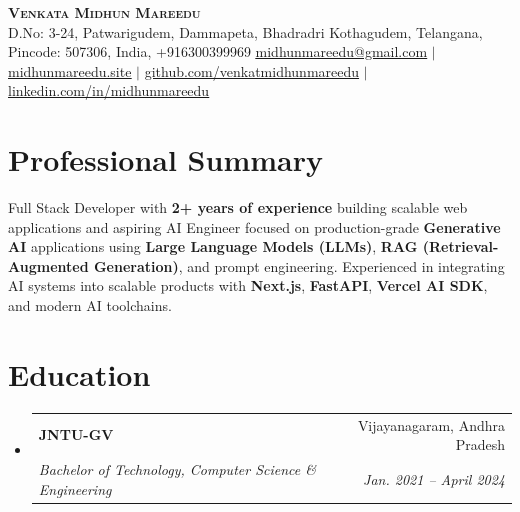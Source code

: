 \documentclass[letterpaper,10pt]{article}
\makeatletter
\newcommand{\summarySection}{
  \small{
    {\vspace{-2pt}}
  }
}
\newcommand{\resumeSubheading}[4]{
  \vspace{-2pt}\item
    \begin{tabular*}{0.97\textwidth}[t]{l@{\extracolsep{\fill}}r}
      \textbf{#1} & #2 \\
      \textit{\small#3} & \textit{\small #4} \\
    \end{tabular*}\vspace{0pt}
}
\newcommand{\resumeSubHeadingListStart}{\begin{itemize}[leftmargin=0.15in, label={}]}
\newcommand{\resumeSubHeadingListEnd}{\end{itemize}}
\makeatother
\begin{document}

\begin{center}
    \textbf{\LARGE \scshape Venkata Midhun Mareedu} \\[3pt]
    \small D.No: 3-24, Patwarigudem, Dammapeta, Bhadradri Kothagudem, Telangana, Pincode: 507306, India, +916300399969
    \small \href{mailto:midhunmareedu@gmail.com}{\underline{midhunmareedu@gmail.com}} $|$ 
    \href{https://midhunmareedu.site}{\underline{midhunmareedu.site}} $|$
    \href{http://github.com/venkatmidhunmareedu}{\underline{github.com/venkatmidhunmareedu}} $|$
    \href{https://www.linkedin.com/in/midhunmareedu}{\underline{linkedin.com/in/midhunmareedu}} \\[3pt]
\end{center}

\section{Professional Summary}
  \vspace{1pt}
  \summarySection{Full Stack Developer with \textbf{2+ years of experience} building scalable web applications and aspiring AI Engineer focused on production-grade \textbf{Generative AI} applications using \textbf{Large Language Models (LLMs)}, \textbf{RAG (Retrieval-Augmented Generation)}, and prompt engineering. Experienced in integrating AI systems into scalable products with \textbf{Next.js}, \textbf{FastAPI}, \textbf{Vercel AI SDK}, and modern AI toolchains.}
\section{Education}
  \resumeSubHeadingListStart
    \resumeSubheading
      {JNTU-GV}{Vijayanagaram, Andhra Pradesh}
      {Bachelor of Technology, Computer Science \& Engineering}{Jan. 2021 -- April 2024}
  \resumeSubHeadingListEnd


  
%
\end{document}
